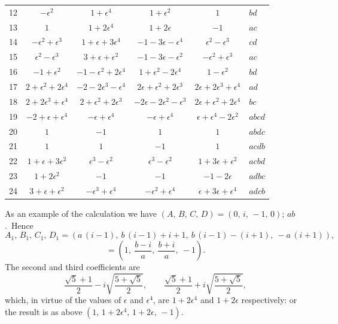 \documentclass[11pt]{article}
\begin{document}
\begin{center}
\begin{center}
\begin{tabular}{r|cccc|l}
12 & $-\epsilon^{2}$ & $1 + \epsilon^{4}$ & $1 + \epsilon^{2}$
   & $1$ & $bd$\\[3pt]
13 & $1$ & $1 + 2\epsilon^{4}$ & $1 + 2\epsilon$ & $-1$ & $ac$\\
14 & $-\epsilon^{2} + \epsilon^{3}$ & $1 + \epsilon + 3\epsilon^{4}$
   & $-1 - 3\epsilon - \epsilon^{4}$ & $\epsilon^{2} - \epsilon^{3}$ & $cd$\\
15 & $\epsilon^{2} - \epsilon^{3}$ & $3 + \epsilon + \epsilon^{2}$
   & $-1 - 3\epsilon - \epsilon^{2}$ & $-\epsilon^{2} + \epsilon^{3}$ & $ac$\\
16 & $-1 + \epsilon^{2}$ & $-1 - \epsilon^{2} + 2\epsilon^{4}$
   & $1 + \epsilon^{2} - 2\epsilon^{4}$
   & $1 - \epsilon^{2}$ & $bd$\\
17 & $2 + \epsilon^{2} + 2\epsilon^{4}$ & $-2 - 2\epsilon^{3} - \epsilon^{4}$
   & $2\epsilon + \epsilon^{2} + 2\epsilon^{3}$
   & $2\epsilon + 2\epsilon^{3} + \epsilon^{4}$ & $ad$\\
18 & $2 + 2\epsilon^{3} + \epsilon^{4}$
   & $2 + \epsilon^{2} + 2\epsilon^{3}$
   & $-2\epsilon - 2\epsilon^{2} - \epsilon^{3}$
   & $2\epsilon + \epsilon^{2} + 2\epsilon^{4}$ & $bc$\\
19 & $-2 + \epsilon + \epsilon^{4}$
   & $-\epsilon + \epsilon^{4}$
   & $-\epsilon + \epsilon^{4}$
   & $\epsilon + \epsilon^{4} - 2\epsilon^{2}$ & $abcd$\\
20 & $1$ & $-1$ & $1$ & $1$ & $abdc$\\
21 & $1$ & $1$ & $-1$ & $1$ & $acdb$\\
22 & $1 + \epsilon + 3\epsilon^{2}$
   & $\epsilon^{3} - \epsilon^{2}$
   & $\epsilon^{3} - \epsilon^{2}$
   & $1 + 3\epsilon + \epsilon^{2}$ & $acbd$\\
23 & $1 + 2\epsilon^{2}$ & $-1$ & $-1$
   & $-1 - 2\epsilon$ & $adbc$\\
24 & $3 + \epsilon + \epsilon^{2}$
   & $-\epsilon^{3} + \epsilon^{4}$
   & $-\epsilon^{2} + \epsilon^{4}$
   & $\epsilon + 3\epsilon + \epsilon^{4}$ & $adcb$\\
\end{tabular}
\end{center}
\end{center}

\medskip
\noindent
As an example of the calculation we have $(A,\, B,\, C,\, D) = (0,\, i,\, -1,\, 0)$;
$ab$.\ Hence
\[
  A_{1},\, B_{1},\, C_{1},\, D_{1}
  = \left( a\,(i - 1),\ b\,(i - 1) + i + 1,\ b\,(i - 1) - (i + 1),\ -a\,(i + 1) \right),
\]
\[
  = \left( 1,\ \frac{b - i}{a},\ \frac{b + i}{a},\ -1 \right).
\]
The second and third coefficients are
\[
  \frac{\sqrt{5} + 1}{2} - i\sqrt{\frac{5 + \sqrt{5}}{2}},
  \qquad
  \frac{\sqrt{5} + 1}{2} + i\sqrt{\frac{5 + \sqrt{5}}{2}},
\]
which, in virtue of the values of $\epsilon$ and $\epsilon^{4}$, are $1 + 2\epsilon^{4}$
and $1 + 2\epsilon$ respectively: or the result is as above
$(1,\, 1 + 2\epsilon^{4},\, 1 + 2\epsilon,\, -1)$.
\end{document}
